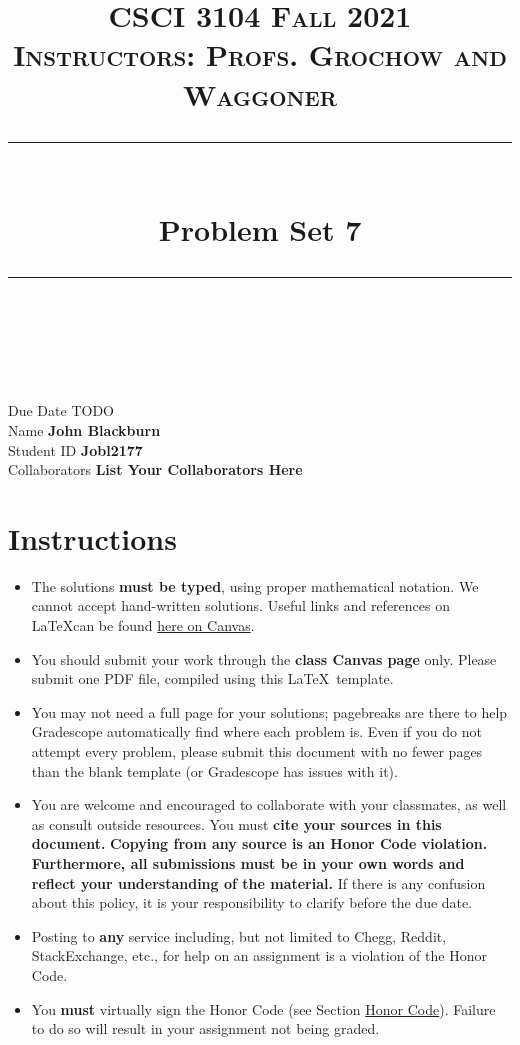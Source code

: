 \documentclass[11pt]{article}
\title{
\normalfont \normalsize 
\textsc{CSCI 3104 Fall 2021 \\ 
Instructors: Profs. Grochow and Waggoner} \\
[10pt] 
\rule{\linewidth}{0.5pt} \\[6pt] 
\huge Problem Set 7 \\
\rule{\linewidth}{2pt}  \\[10pt]
}
\date{}
\theoremstyle{definition}
\theoremstyle{definition}
\theoremstyle{definition}
\begin{document}
\maketitle


\noindent
Due Date \dotfill TODO \\
Name \dotfill \textbf{John Blackburn} \\
Student ID \dotfill \textbf{Jobl2177} \\
Collaborators \dotfill \textbf{List Your Collaborators Here}

\tableofcontents

\section*{Instructions}
 \begin{itemize}
	\item The solutions \textbf{must be typed}, using proper mathematical notation. We cannot accept hand-written solutions. Useful links and references on \LaTeX can be found \href{https://canvas.colorado.edu/courses/75824/pages/latex}{here on Canvas}.
	\item You should submit your work through the \textbf{class Canvas page} only. Please submit one PDF file, compiled using this \LaTeX \ template.
	\item You may not need a full page for your solutions; pagebreaks are there to help Gradescope automatically find where each problem is. Even if you do not attempt every problem, please submit this document with no fewer pages than the blank template (or Gradescope has issues with it).

	\item You are welcome and encouraged to collaborate with your classmates, as well as consult outside resources. You must \textbf{cite your sources in this document.} \textbf{Copying from any source is an Honor Code violation. Furthermore, all submissions must be in your own words and reflect your understanding of the material.} If there is any confusion about this policy, it is your responsibility to clarify before the due date. 

	\item Posting to \textbf{any} service including, but not limited to Chegg, Reddit, StackExchange, etc., for help on an assignment is a violation of the Honor Code.

	\item You \textbf{must} virtually sign the Honor Code (see Section \hyperlink{HonorCode}{Honor Code}). Failure to do so will result in your assignment not being graded.
\end{itemize}
\end{document}
